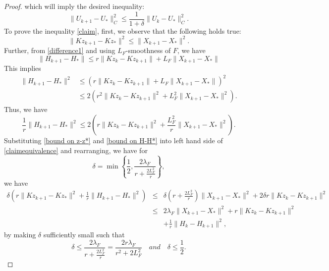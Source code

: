 \begin{itemize}
\begin{proof}
which will imply the desired inequality: 
\begin{equation}
\|U_{k+1} - U_*\|^2_C \leq \frac{1}{1 + \delta} \|U_{k} - U_*\|^2_C.
\end{equation}
To prove the inequality \eqref{claim}, first, we observe that the following holds true:   
\begin{equation}\label{bound on z-z*}
\|Kz_{k+1} - Kz_* \|^2 \leq \|X_{k+1} -X_* \|^2.  
\end{equation}
Further, from \eqref{difference1} and using $L_F$-smoothness of $F$, we have  
\begin{equation}
\|H_{k+1} - H_* \| \leq r \|K z_k - K z_{k+1} \| + L_F \| X_{k+1} -  X_*\|
\end{equation}
This implies 
\begin{equation}\label{bound on H-H*}
\begin{split}
\|H_{k+1} - H_*\|^2 & \leq \left(r \|Kz_k - Kz_{k+1} \| + L_F\|X_{k+1} -  X_*\| \right)^2 \\  & \leq 2 \left( r^2 \| Kz_k - Kz_{k+1}\|^2 + L_F^2 \| X_{k+1} -  X_*\|^2 \right). 
\end{split}
\end{equation}
Thus, we have 
\begin{equation}
\frac{1}{r} \|H_{k+1} - H_*\|^2 \leq 2 \left( r \| Kz_k - Kz_{k+1}\|^2 + \frac{L_F^2}{r} \| X_{k+1} -  X_*\|^2 \right).
\end{equation}
Substituting \eqref{bound on z-z*} and \eqref{bound on H-H*} into left hand side of \eqref{claimequivalence} and rearranging, we have for 
\begin{equation}
\delta = \min \left \{ \frac{1}{2}, \frac{2\lambda_F}{ r + \frac{2L_F^2}{r} } \right \}, 
\end{equation} 
we have 
\begin{eqnarray*}
\delta \left(r\|Kz_{k+1} - Kz_{*} \|^2 + \frac{1}{r} \|H_{k+1} - H_{*}\|^2 \right) &\leq& \delta \left( r + \frac{2L_F^2}{r} \right ) \| X_{k+1} -  X_*\|^2 + 2\delta r \|Kz_k - Kz_{k+1} \|^2 \\
&\leq& 2\lambda_F \|X_{k+1} - X_* \|^2 + r \|K z_{k}- Kz_{k+1}\|^2 \\
&& + \frac{1}{r}\|H_k - H_{k+1} \|^2,
\end{eqnarray*}
by making $\delta$ sufficiently small such that 
\begin{equation}
\delta \leq \frac{2\lambda_F}{ r + \frac{2L_F^2}{r}} = \frac{2r\lambda_F}{r^2 + 2L_F^2} \quad and \quad \delta \leq \frac{1}{2}.
\end{equation}

\end{proof}
\end{itemize}
